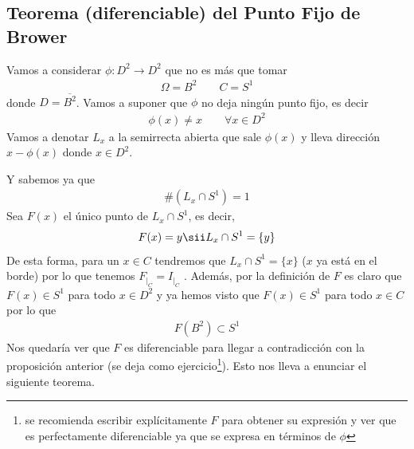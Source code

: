 \subsection{Teorema (diferenciable) del Punto Fijo de Brower}
Vamos a considerar $\phi : D^2 \to D^2$ que no es más que tomar
\begin{gather*}
    \Omega = B^2 \qquad C=S^1
\end{gather*}
donde $D = \overline{B^2}$. Vamos a suponer que $\phi$ no deja ningún punto fijo, es decir
\begin{gather*}
    \phi(x) \neq x \qquad \forall x \in D^2
\end{gather*}
Vamos a denotar $L_x$ a la semirrecta abierta que sale $\phi(x)$ y lleva dirección $x-\phi(x)$ donde $x\in D^2$.
\begin{figure}[H]
    \centering
\end{figure}
Y sabemos ya que 
\begin{gather*}
    \#(L_x \cap S^1) = 1
\end{gather*}
Sea $F(x)$ el único punto de $L_x\cap S^1$, es decir,
\begin{gather*}
    F(x) = y \sii L_x \cap S^1 = \{y\}
\end{gather*}
De esta forma, para un $x\in C$ tendremos que $L_x\cap S^1=\{x\}$ ($x$ ya está en el borde) por lo que tenemos $F_{|_C} = I_{|_C}$ . Además, por la definición de $F$ es claro que $F(x)\in S^1$ para todo $x\in D^2$ y ya hemos visto que $F(x)\in S^1$ para todo $x\in C$ por lo que 
\begin{gather*}
    F(B^2) \subset S^1
\end{gather*}
Nos quedaría ver que $F$ es diferenciable para llegar a contradicción con la proposición anterior (se deja como ejercicio\footnote{se recomienda escribir explícitamente $F$ para obtener su expresión y ver que es perfectamente diferenciable ya que se expresa en términos de $\phi$}). Esto nos lleva a enunciar el siguiente teorema.

